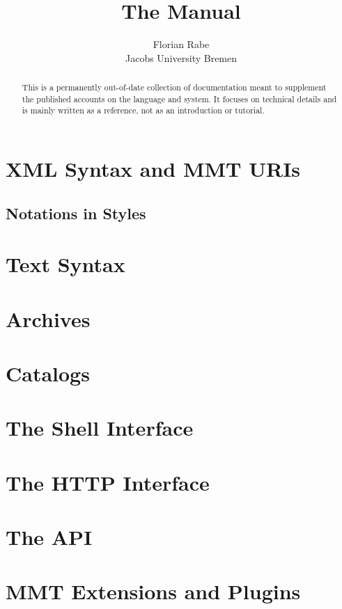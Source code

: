 \documentclass{article}
\title{The {\mmt} Manual}
\author{Florian Rabe \\
Jacobs University Bremen}
\begin{document}
\maketitle

\begin{abstract}
This is a permanently out-of-date collection of documentation meant to supplement the published accounts on the \mmt language and system.
It focuses on technical details and is mainly written as a reference, not as an introduction or tutorial.
\end{abstract}

\section{XML Syntax and MMT URIs}\label{sec:syntax}
  

\subsection{Notations in Styles}\label{sec:notations}
  

\section{Text Syntax}\label{sec:syntax}
  

\section{Archives}\label{sec:archives}
  

\section{Catalogs}\label{sec:catalog}
  

\section{The Shell Interface}\label{sec:shell}
  

\section{The HTTP Interface}\label{sec:http}
  

\section{The API}

\section{MMT Extensions and Plugins}\label{sec:extensions}
  




\end{document}
